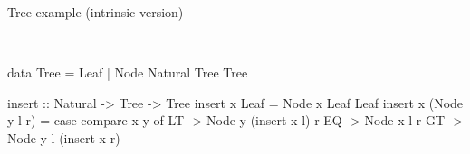\documentclass[aspectratio=169]{beamer}
\newcommand\resetVars{
  \def\sourceRatio{.5}
  \def\zoom{1}
  \def\hsFontsize{\normalsize}
  \def\midruleL{-1cm}
  \def\midruleR{.5cm}
  \def\sourceIcon{agda}
}
\def\hsSize{\fpeval{1 - \sourceRatio}}
\def\rightSize{\hsSize\textwidth}
\newcommand\midrule{\hspace{\midruleL}\vrule\hspace{\midruleR}}
\begin{document}
\begin{frame}[fragile]{Tree example (intrinsic version)}
\begin{sourcepage}
\begin{code}
\>[14]\AgdaSpace{}%
\AgdaSpace{}%
\AgdaSpace{}%
\AgdaSpace{}%
\AgdaSymbol{(}\AgdaSpace{}%
\AgdaSpace{}%
\AgdaSpace{}%
\AgdaSpace{}%
\AgdaSymbol{)}\<%
\\
\>[0]\AgdaSymbol{\{-\#}\AgdaSpace{}%
\AgdaSpace{}%
\AgdaSpace{}%
\AgdaSpace{}%
\AgdaSymbol{\#-\}}\<%
\end{code}
\end{sourcepage}
\midrule
\begin{minipage}{\rightSize}
\begin{haskellcode}
data Tree = Leaf
          | Node Natural Tree Tree

insert :: Natural -> Tree -> Tree
insert x Leaf = Node x Leaf Leaf
insert x (Node y l r)
  = case compare x y of
        LT -> Node y (insert x l) r
        EQ -> Node x l r
        GT -> Node y l (insert x r)
\end{haskellcode}
\end{minipage}
\resetVars
\end{frame}
\end{document}
